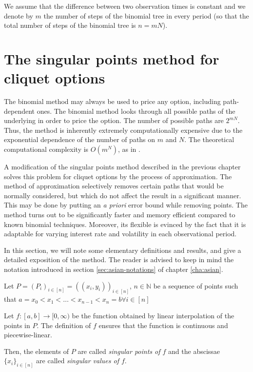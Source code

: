 We assume that the difference between two observation times is constant and we denote by $m$ the number of steps of the binomial tree in every period (so that the total number of steps of the binomial tree is $ n = m N $).



\section{The singular points method for cliquet options}
\label{sec:clq-sp}

The binomial method may always be used to price any option, including path-dependent ones. The binomial method looks through all possible paths of the underlying in order to price the option. The number of possible paths are $ 2 ^ {m N} $. Thus, the method is inherently extremely computationally expensive due to the exponential dependence of the number of paths on $m$ and $ N $. The theoretical computational complexity is $ O( m^{N} ) $, as in \cite[Page 128]{Gaudenzi2011}.

A modification of the singular points method described in the previous chapter solves this problem for cliquet options by the process of approximation. The method of approximation selectively removes certain paths that would be normally considered, but which do not affect the result in a significant manner. This may be done by putting an \emph{a priori} error bound while removing points. The method turns out to be significantly faster and memory efficient compared to known binomial techniques. Moreover, its flexible is evinced by the fact that it is adaptable for varying interest rate and volatility in each observational period.

In this section, we will note some elementary definitions and results, and give a detailed exposition of the method. The reader is advised to keep in mind the notation introduced in section \ref{sec:asian-notations} of chapter \ref{cha:asian}.

\begin{dfn}
	\label{def:clq-sp}
	Let $ P = (P_i)_{i \in [n]} = ( (x_i, y_i) )_{i \in [n]} $, $ n \in \mathbb{N} $ be a sequence of points such that $ a = x_0 < x_1 < \dots < x_{n-1} < x_n = b \forall i \in [n] $
	
	Let $ f:[a,b] \to [0, \infty) $ be the function obtained by linear interpolation of the points in $P$. The definition of $f$ ensures that the function is continuous and piecewise-linear.
	
	Then, the elements of $P$ are called \emph{singular points of $f$} and the abscissae $ \{ x_i \}_{i \in [n]} $ are called \emph{singular values of $f$}.
\end{dfn}


